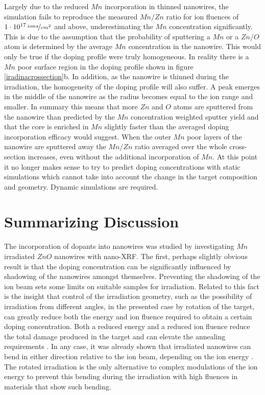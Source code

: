 Largely due to the reduced $Mn$ incorporation in thinned nanowires, the simulation fails to reproduce the measured $Mn/Zn$ ratio for ion fluences of $1\cdot 10^{17}\,\nicefrac{ions}{cm^2}$ and above, underestimating the $Mn$ concentration significantly. This is due to the assumption that the probability of sputtering a $Mn$ or a $Zn/O$ atom is determined by the average $Mn$ concentration in the nanowire. This would only be true if the doping profile were truly homogeneous. In reality there is a $Mn$ poor surface region in the doping profile shown in figure \ref{iradinacrossection}b. In addition, as the nanowire is thinned during the irradiation, the homogeneity of the doping profile will also suffer. A peak emerges in the middle of the nanowire as the radius becomes equal to the ion range and smaller. In summary this means that more $Zn$ and $O$ atoms are sputtered from the nanowire than predicted by the $Mn$ concentration weighted sputter yield and that the core is enriched in $Mn$ slightly faster than the averaged doping incorporation efficacy would suggest. When the outer $Mn$ poor layers of the nanowire are sputtered away the $Mn/Zn$ ratio averaged over the whole cross-section increases, even without the additional incorporation of $Mn$. At this point it no longer makes sense to try to predict doping concentrations with static simulations which cannot take into account the change in the target composition and geometry. Dynamic simulations are required.
 

\section{Summarizing Discussion}

The incorporation of dopants into nanowires was studied by investigating $Mn$ irradiated $ZnO$ nanowires with nano-XRF. The first, perhaps slightly obvious result is that the doping concentration can be significantly influenced by shadowing of the nanowires amongst themselves.  Preventing the shadowing of the ion beam sets some limits on suitable samples for irradiation. 
Related to this fact is the insight that control of the irradiation geometry, such as the possibility of irradiation from different angles, in the presented case by rotation of the target, can greatly reduce both the energy and ion fluence required to obtain a certain doping concentration. Both a reduced energy and a reduced ion fluence reduce the total damage produced in the target and can elevate the annealing requirements \cite{borschel_new_2011,paschoal_hopping_2012,borschel_ion-solid_2012,kumar_magnetic_2013,paschoal_magnetoresistance_2014}. In any case, it was already shown that irradiated nanowires can bend in either direction relative to the ion beam, depending on the ion energy \cite{borschel_permanent_2011}. The rotated irradiation is the only alternative to complex modulations of the ion energy to prevent this bending during the irradiation with high fluences in materials that show such bending.

